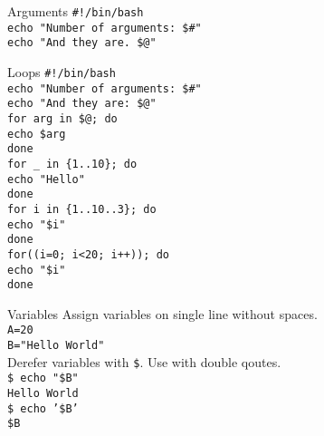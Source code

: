 \documentclass{beamer}
\let\tt\texttt
\begin{document}
\begin{frame}{Arguments}
        \tt{\#!/bin/bash}                       \\
        \tt{echo "Number of arguments: \$\#"}   \\
        \tt{echo "And they are. \$@"}           \\
\end{frame}

\begin{frame}{Loops}
        \tt{\#!/bin/bash}                       \\
        \tt{echo "Number of arguments: \$\#"}   \\
        \tt{echo "And they are: \$@"}           \\
        \tt{for arg in \$@; do}                 \\
        \quad \tt{echo \$arg}                   \\
        \tt{done}                               \\
        \tt{for \_ in \{1..10\}; do}            \\
        \quad \tt{echo "Hello"}                 \\
        \tt{done}                               \\
        \tt{for i in \{1..10..3\}; do}          \\
        \quad \tt{echo "\$i"}                   \\
        \tt{done}                               \\
        \tt{for((i=0; i<20; i++)); do}          \\
        \quad \tt{echo "\$i"}                   \\
        \tt{done}                               \\
\end{frame}

\begin{frame}{Variables}
        Assign variables on single line without spaces. \\
        \tt{A=20}                                       \\
        \tt{B="Hello World"}                            \\
        Derefer variables with \tt{\$}. Use with double qoutes.  \\
        \tt{\$ echo "\$B"}                              \\
        \tt{Hello World}                                \\
        \tt{\$ echo '\$B'}                              \\
        \tt{\$B}
\end{frame}
\end{document}
